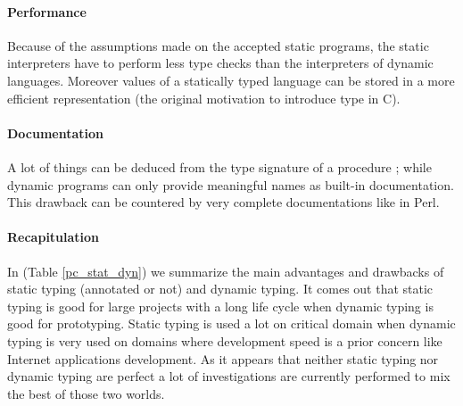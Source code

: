 \documentclass[a4paper]{report}
\newcommand{\reftab}[1]{(Table \ref{#1})}
\begin{document}
\paragraph{Performance} Because of the assumptions made on the accepted static programs, the static interpreters have to perform less type checks than the interpreters of dynamic languages. Moreover values of a statically typed language can be stored in a more efficient representation (the original motivation to introduce type in C).

\paragraph{Documentation} A lot of things can be deduced from the type signature of a procedure ; while dynamic programs can only provide meaningful names as built-in documentation. This drawback can be countered by very complete documentations like in Perl.

\paragraph{Recapitulation} In \reftab{pc_stat_dyn} we summarize the main advantages and drawbacks of static typing (annotated or not) and dynamic typing. It comes out that static typing is good for large projects with a long life cycle when dynamic typing is good for prototyping. Static typing is used a lot on critical domain when dynamic typing is very used on domains where development speed is a prior concern like Internet applications development. As it appears that neither static typing nor dynamic typing are perfect a lot of investigations are currently performed to mix the best of those two worlds.
\end{document}
